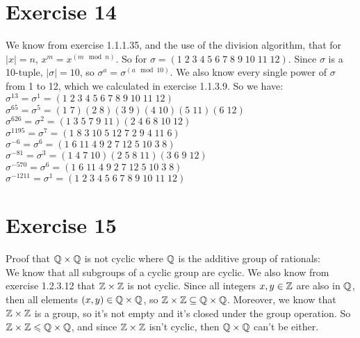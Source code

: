 \documentclass[12pt]{article}
\begin{document}
    \section*{Exercise 14}
    We know from exercise 1.1.1.35, and the use of the division
    algorithm, that for $|x| = n$, $x^m = x^{(m \mod n)}$.
    So for $\sigma = (1\;2\;3\;4\;5\;6\;7\;8\;9\;10\;11\;12)$.
    Since $\sigma$ is a 10-tuple, $|\sigma| = 10$,
    so $\sigma^a = \sigma^{(a \mod 10)}$.
    We also know every single power of $\sigma$ from 1 to 12,
    which we calculated in exercise 1.1.3.9.
    So we have: \\
    $\sigma^{13} = \sigma^1 = (1\;2\;3\;4\;5\;6\;7\;8\;9\;10\;11\;12)$ \\
    $\sigma^{65} = \sigma^5 = (1\;7)(2\;8)(3\;9)(4\;10)(5\;11)(6\;12)$ \\
    $\sigma^{626} = \sigma^2 = (1\;3\;5\;7\;9\;11)(2\;4\;6\;8\;10\;12)$ \\
    $\sigma^{1195} = \sigma^7 = (1\;8\;3\;10\;5\;12\;7\;2\;9\;4\;11\;6)$ \\
    $\sigma^{-6} = \sigma^6 = (1\;6\;11\;4\;9\;2\;7\;12\;5\;10\;3\;8)$ \\
    $\sigma^{-81} = \sigma^3 = (1\;4\;7\;10)(2\;5\;8\;11)(3\;6\;9\;12)$ \\
    $\sigma^{-570} = \sigma^6 = (1\;6\;11\;4\;9\;2\;7\;12\;5\;10\;3\;8)$ \\
    $\sigma^{-1211} = \sigma^1 = (1\;2\;3\;4\;5\;6\;7\;8\;9\;10\;11\;12)$


    \section*{Exercise 15}
    Proof that $\mathbb{Q} \times \mathbb{Q}$ is not cyclic
    where $\mathbb{Q}$ is the additive group of rationals: \\
    We know that all subgroups of a cyclic group are cyclic.
    We also know from exercise 1.2.3.12 that $\mathbb{Z} \times \mathbb{Z}$
    is not cyclic.
    Since all integers $x, y \in \mathbb{Z}$ are also in $\mathbb{Q}$,
    then all elements $(x, y) \in \mathbb{Q} \times \mathbb{Q}$,
    so $\mathbb{Z} \times \mathbb{Z} \subseteq \mathbb{Q} \times \mathbb{Q}$.
    Moreover, we know that $\mathbb{Z} \times \mathbb{Z}$ is a group,
    so it's not empty and it's closed under the group operation.
    So $\mathbb{Z} \times \mathbb{Z} \leqslant \mathbb{Q} \times \mathbb{Q}$,
    and since $\mathbb{Z} \times \mathbb{Z}$ isn't cyclic,
    then $\mathbb{Q} \times \mathbb{Q}$ can't be either.
\end{document}

